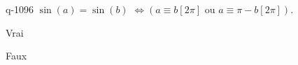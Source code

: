 \begin{truefalse}{q-1096}
$\sin(a)=\sin(b)$  $\Leftrightarrow \left(a\equiv b [2\pi]\text{ ou } a\equiv \pi-b [2\pi]\right)$.
\item* Vrai
\item Faux
\end{truefalse}

